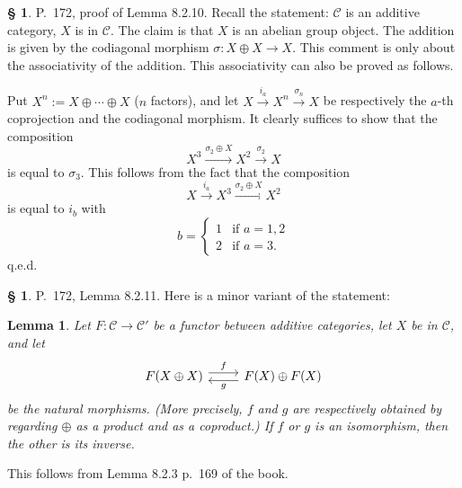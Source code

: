 \documentclass[12pt]{article}
\newtheorem{lem}[thm]{Lemma}
\theoremstyle{remark}
\theoremstyle{definition}
\newtheorem{s}[thm]{\S}
\newcommand{\C}{\mathcal C}
\newcommand{\xr}{\xrightarrow}
\begin{document}
\begin{s} 
P.~172, proof of Lemma 8.2.10. Recall the statement: $\C$ is an additive category, $X$ is in $\C$. The claim is that $X$ is an abelian group object. The addition is given by the codiagonal morphism $\sigma:X\oplus X\to X$. This comment is only about the associativity of the addition. This associativity can also be proved as follows. 

Put $X^n:=X\oplus\cdots\oplus X$ ($n$ factors), and let $X\xr{i_a}X^n\xr{\sigma_n}X$ be respectively the $a$-th coprojection and the codiagonal morphism. It clearly suffices to show that the composition 
$$
X^3\xr{\sigma_2\oplus X}X^2\xr{\sigma_2}X
$$ 
is equal to $\sigma_3$. This follows from the fact that the composition 
$$
X\xr{i_a}X^3\xr{\sigma_2\oplus X}X^2
$$ 
is equal to $i_b$ with 
$$
b=\begin{cases}1&\text{if }a=1,2\\2&\text{if }a=3.\end{cases}
$$ 
q.e.d.
\end{s}
%
%
\begin{s} 
P.~172, Lemma 8.2.11. Here is a minor variant of the statement: 
%
\begin{lem}
Let $F:\C\to\C'$ be a functor between additive categories, let $X$ be in $\C$, and let 
$$
\begin{tikzcd}
F(X\oplus X)\ar[yshift=.7ex]{r}{f}&F(X)\oplus F(X)\ar[yshift=-.7ex]{l}{g}
\end{tikzcd}
$$ 
be the natural morphisms. (More precisely, $f$ and $g$ are respectively obtained by regarding $\oplus$ as a product and as a coproduct.) If $f$ or $g$ is an isomorphism, then the other is its inverse. 
\end{lem}
%
This follows from Lemma 8.2.3 p.~169 of the book.
\end{s}
%
%
\end{document}
